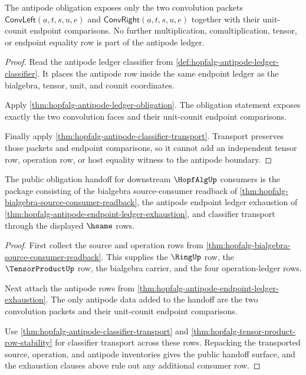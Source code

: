 \begin{theorem}
\label{thm:hopfalg-antipode-endpoint-ledger-exhaustion}
The antipode obligation exposes only the two convolution packets
$\mathsf{ConvLeft}(a,t,s,u,e)$ and $\mathsf{ConvRight}(a,t,s,u,e)$ together
with their unit-counit endpoint comparisons. No further multiplication,
comultiplication, tensor, or endpoint equality row is part of the antipode
ledger.
\end{theorem}
\begin{proof}
Read the antipode ledger classifier from
\autoref{def:hopfalg-antipode-ledger-classifier}. It places the antipode row
inside the same endpoint ledger as the bialgebra, tensor, unit, and counit
coordinates.

Apply \autoref{thm:hopfalg-antipode-ledger-obligation}. The obligation
statement exposes exactly the two convolution faces and their unit-counit
endpoint comparisons.

Finally apply \autoref{thm:hopfalg-antipode-classifier-transport}. Transport
preserves those packets and endpoint comparisons, so it cannot add an
independent tensor row, operation row, or host equality witness to the
antipode boundary.
\end{proof}

\begin{theorem}
\label{thm:hopfalg-obligation-public-handoff}
The public obligation handoff for downstream $\HopfAlgUp$ consumers is the
package consisting of the bialgebra source-consumer readback of
\autoref{thm:hopfalg-bialgebra-source-consumer-readback}, the antipode
endpoint ledger exhaustion of
\autoref{thm:hopfalg-antipode-endpoint-ledger-exhaustion}, and classifier
transport through the displayed $\hsame$ rows.
\end{theorem}
\begin{proof}
First collect the source and operation rows from
\autoref{thm:hopfalg-bialgebra-source-consumer-readback}. This supplies the
$\RingUp$ row, the $\TensorProductUp$ row, the bialgebra carrier, and the
four operation-ledger rows.

Next attach the antipode rows from
\autoref{thm:hopfalg-antipode-endpoint-ledger-exhaustion}. The only antipode
data added to the handoff are the two convolution packets and their
unit-counit endpoint comparisons.

Use \autoref{thm:hopfalg-antipode-classifier-transport} and
\autoref{thm:hopfalg-tensor-product-row-stability} for classifier transport
across these rows. Repacking the transported source, operation, and antipode
inventories gives the public handoff surface, and the exhaustion clauses above
rule out any additional consumer row.
\end{proof}

